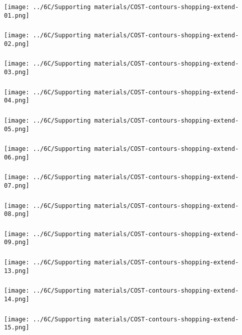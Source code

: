 \begin{frame}\frametitle{}
	\centerline{\texttt{[image: ../6C/Supporting materials/COST-contours-shopping-extend-01.png]}}
\end{frame}
\begin{frame}\frametitle{}
	\centerline{\texttt{[image: ../6C/Supporting materials/COST-contours-shopping-extend-02.png]}}
\end{frame}
\begin{frame}\frametitle{}
	\centerline{\texttt{[image: ../6C/Supporting materials/COST-contours-shopping-extend-03.png]}}
\end{frame}
\begin{frame}\frametitle{}
	\centerline{\texttt{[image: ../6C/Supporting materials/COST-contours-shopping-extend-04.png]}}
\end{frame}
\begin{frame}\frametitle{}
	\centerline{\texttt{[image: ../6C/Supporting materials/COST-contours-shopping-extend-05.png]}}
\end{frame} 
\begin{frame}\frametitle{}
	\centerline{\texttt{[image: ../6C/Supporting materials/COST-contours-shopping-extend-06.png]}}
\end{frame}
\begin{frame}\frametitle{}
	\centerline{\texttt{[image: ../6C/Supporting materials/COST-contours-shopping-extend-07.png]}}
\end{frame}
\begin{frame}\frametitle{}
	\centerline{\texttt{[image: ../6C/Supporting materials/COST-contours-shopping-extend-08.png]}}
\end{frame}
\begin{frame}\frametitle{}
	\centerline{\texttt{[image: ../6C/Supporting materials/COST-contours-shopping-extend-09.png]}}
\end{frame}
\begin{frame}\frametitle{}
	\centerline{\texttt{[image: ../6C/Supporting materials/COST-contours-shopping-extend-13.png]}}
\end{frame}
\begin{frame}\frametitle{}
	\centerline{\texttt{[image: ../6C/Supporting materials/COST-contours-shopping-extend-14.png]}}
\end{frame}
\begin{frame}\frametitle{}
	\centerline{\texttt{[image: ../6C/Supporting materials/COST-contours-shopping-extend-15.png]}}
\end{frame}
